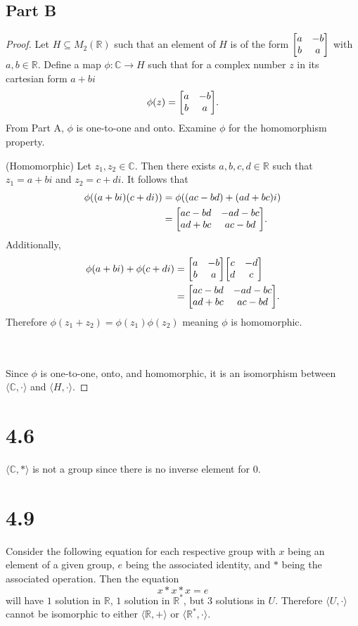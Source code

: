 \documentclass[12pt]{extarticle}
\begin{document}
\subsection*{Part B}
\begin{proof}
	Let $H \subseteq M_2(\mathbb{R})$ such that an element of $H$ is of the form $\mqty[a & -b \\ b & a]$ with $a,b \in \mathbb{R}$. Define a map $\phi : \mathbb{C} \to H$ such that for a complex number $z$ in its cartesian form $a + bi$
	\[
		\phi(z) = \mqty[a & -b \\ b & a]
	.\]
	From Part A, $\phi$ is one-to-one and onto. Examine $\phi$ for the homomorphism property. \\

	\qquad\begin{minipage}{\dimexpr\textwidth-2cm}
		(Homomorphic)\quad 
		Let $z_1, z_2 \in \mathbb{C}$. Then there exists $a,b,c,d \in \mathbb{R}$ such that $z_1 = a+bi$ and $z_2 = c+di$. It follows that
		\begin{align*}
			\phi((a+bi)(c+di)) &= \phi((ac - bd) + (ad + bc)i) \\
														&= \mqty[ac - bd & -ad-bc \\ ad+bc & ac-bd]
		.\end{align*}
		Additionally,
		\begin{align*}
			\phi(a+bi) + \phi(c+di) &= \mqty[a & -b \\ b & a]\mqty[c & -d \\ d & c] \\
															&= \mqty[ac - bd & -ad - bc \\ ad + bc & ac - bd]
		.\end{align*}
		Therefore $\phi(z_1 + z_2) = \phi(z_1)\phi(z_2)$ meaning $\phi$ is homomorphic.
	\end{minipage} \\
	\\

	Since $\phi$ is one-to-one, onto, and homomorphic, it is an isomorphism between $\langle \mathbb{C}, \cdot \rangle$ and $\langle H, \cdot \rangle$.
\end{proof}

\section*{4.6}
$\langle \mathbb{C}, * \rangle$ is not a group since there is no inverse element for $0$.

\section*{4.9}
Consider the following equation for each respective group with $x$ being an element of a given group, $e$ being the associated identity, and $*$ being the associated operation. Then the equation
\[
	x * x * x = e
\]
will have $1$ solution in $\mathbb{R}$, $1$ solution in $\mathbb{R}^*$, but $3$ solutions in $U$. Therefore $\langle U, \cdot \rangle$ cannot be isomorphic to either $\langle \mathbb{R}, + \rangle$ or $\langle \mathbb{R}^*, \cdot \rangle$.
\end{document}
